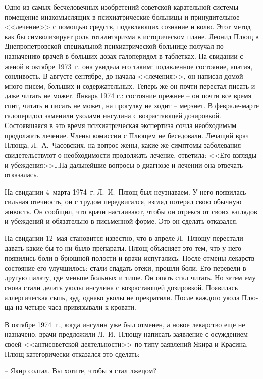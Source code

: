 \documentclass{book}
\begin{document}
Одно из самых бесчеловечных изобретений советской карательной системы -- помещение инакомыслящих в психиатрические больницы и принудительное <<лечение>> с помощью средств, подавляющих сознание и волю. Этот метод как бы символизирует роль тоталитаризма в историческом плане. Леонид Плющ в Днепропетровской специальной психиатрической больнице полу­чал по назначению врачей в больших дозах галоперидол в таблет­ках. На свидании с женой в октябре 1973~г. она увидела его та­ким: подавленное состояние, апатия, сонливость. В августе-сен­тябре, до начала <<лечения>>, он написал домой много писем, боль­ших и содержательных. Теперь же он почти перестал писать и да­же читать не может. Январь 1974 г.: состояние прежнее -- он поч­ти все время спит, читать и писать не может, на прогулку не хо­дит -- мерзнет. В феврале-марте галоперидол заменили уколами инсулина с возрастающей дозировкой. Состоявшаяся в это вре­мя психиатрическая экспертиза сочла необходимым продолжать лечение. Члены комиссии с Плющем не беседовали. Лечащий 
врач Плюща, Л.~А.~Часовских, на вопрос жены, какие же симптомы заболевания свидетельствуют о необходимости продолжать лечение, ответила: <<Его взгляды и убеждения>>\ldots На дальнейшие вопросы о диагнозе и лечении она отвечать отказалась.

На свидании 4~марта 1974~г. Л.~И.~Плющ был неузнаваем. У него появилась сильная отечность, он с трудом передвигался, взгляд потерял свою обычную живость. Он сообщил, что врачи настаивают, чтобы он отрекся от своих взглядов и убеж­дений и обязательно в письменной форме. Это он сделать отказался.

На свидании 12~мая становится известно, что в апреле Л.~Плю­щу перестали давать какие бы то ни было препараты. Плющ объясняет это тем, что у него появились боли в брюшной поло­сти и врачи испугались. После отмены лекарств состояние его улучшилось: стали спадать отеки, прошли боли. Его перевели в другую палату, где меньше больных и тише. Он опять стал читать. Но затем ему снова стали делать уколы инсулина с возрастающей дозировкой. Появилась аллергическая сыпь, зуд, однако уколы не прекратили. После каждого укола Плю­ща на четыре часа привязывали к кровати.

В октябре 1974~г., когда инсулин уже был отменен, а но­вое лекарство еще не назначено, врачи предложили Л.~И.~Плю­щу написать заявление с осуждением своей <<антисоветской деятельности>> по типу заявлений Якира и Красина. Плющ кате­горически отказался это сделать:

-- Якир солгал. Вы хотите, чтобы я стал лжецом?
\end{document}
